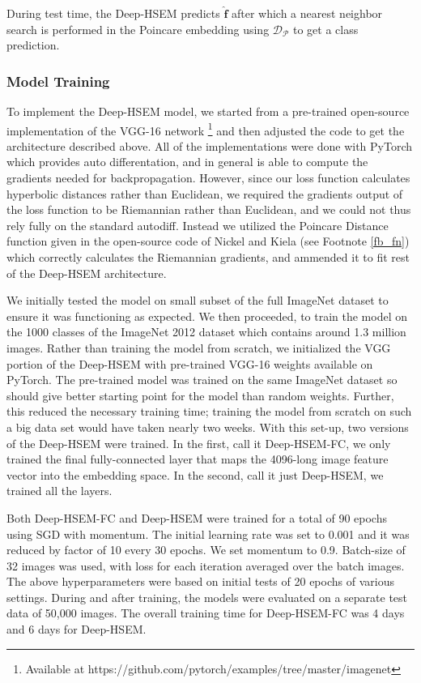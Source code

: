 \documentclass[12pt]{report}
\begin{document}
During test time, the Deep-HSEM predicts $\mathbf{\hat{f}}$ after which a nearest neighbor search is performed in the Poincare embedding using $\mathcal{D_{\mathcal{P}}}$ to get a class prediction.

\subsubsection{Model Training}
To implement the Deep-HSEM model, we started from a pre-trained open-source implementation of the VGG-16 network \footnote{Available at https://github.com/pytorch/examples/tree/master/imagenet} and then adjusted the code to get the architecture described above. All of the implementations were done with PyTorch \cite{Paszke2017} which provides auto differentation, and in general is able to compute the gradients needed for backpropagation. However, since our loss function calculates hyperbolic distances rather than Euclidean, we required the gradients output of the loss function to be Riemannian rather than Euclidean, and we could not thus rely fully on the standard autodiff. Instead we utilized the Poincare Distance function given in the open-source code of Nickel and Kiela \cite{Nickel2017} (see Footnote \ref{fb_fn}) which correctly calculates the Riemannian gradients, and ammended it to fit rest of the Deep-HSEM architecture.

We initially tested the model on small subset of the full ImageNet dataset to ensure it was functioning as expected. We then proceeded, to train the model on the 1000 classes of the ImageNet 2012 dataset which contains around 1.3 million images. Rather than training the model from scratch, we initialized the VGG portion of the Deep-HSEM with pre-trained VGG-16 weights available on PyTorch. The pre-trained model was trained on the same ImageNet dataset so should give better starting point for the model than random weights. Further, this reduced the necessary training time; training the model from scratch on such a big data set would have taken nearly two weeks. With this set-up, two versions of the Deep-HSEM were trained. In the first, call it Deep-HSEM-FC, we only trained the final fully-connected layer that maps the 4096-long image feature vector into the embedding space. In the second, call it just Deep-HSEM, we trained all the layers.

Both Deep-HSEM-FC and Deep-HSEM were trained for a total of 90 epochs using SGD with momentum. The initial learning rate was set to 0.001 and it was reduced by factor of 10 every 30 epochs. We set momentum to 0.9. Batch-size of 32 images was used, with loss for each iteration averaged over the batch images. The above hyperparameters were based on initial tests of 20 epochs of various settings. During and after training, the models were evaluated on a separate test data of 50,000 images. The overall training time for Deep-HSEM-FC was 4 days and 6 days for Deep-HSEM.
\end{document}
